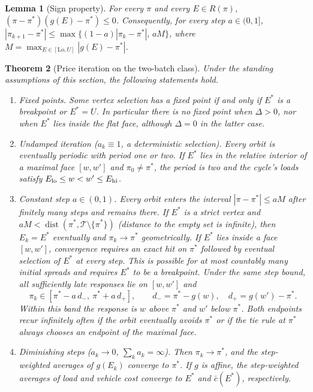 \documentclass[11pt]{article}
\newtheorem{theorem}{Theorem}
\newtheorem{lemma}[theorem]{Lemma}
\theoremstyle{definition}\newtheorem{definition}[theorem]{Definition}
\theoremstyle{remark}\newtheorem{remark}[theorem]{Remark}
\begin{document}
\begin{lemma}[Sign property]\label{lem:sign}
For every $\pi$ and every $E\in R(\pi)$, $(\pi-\pi^*)(g(E)-\pi^*)\le0$.
Consequently, for every step $a\in(0,1]$,
$|\pi_{k+1}-\pi^*|\le\max\{(1-a)|\pi_k-\pi^*|,\,aM\}$, where
$M=\max_{E\in[\mathrm{Lo},U]}|g(E)-\pi^*|$.
\end{lemma}

\begin{theorem}[Price iteration on the two-batch class]\label{thm:iteration}
Under the standing assumptions of this section, the following statements hold.
\begin{enumerate}[label=(\alph*),itemsep=2pt]
\item \emph{Fixed points.} Some vertex selection has a fixed point if and only if
$E^*$ is a breakpoint or $E^*=U$. In particular there is no fixed point when $\Delta>0$, nor when $E^*$ lies
inside the flat face, although $\Delta=0$ in the latter case.
\item \emph{Undamped iteration} ($a_k\equiv1$, a deterministic selection). Every orbit is eventually
periodic with period one or two. If $E^*$ lies in the relative interior of a
maximal face $[w,w']$ and $\pi_0\neq\pi^*$, the period is two and the cycle's loads satisfy
$E_{\rm lo}\le w<w'\le E_{\rm hi}$.
\item \emph{Constant step} $a\in(0,1)$. Every orbit enters the interval
$|\pi-\pi^*|\le aM$ after finitely many steps and remains there. If $E^*$ is a strict
vertex and $aM<\operatorname{dist}(\pi^*,\mathcal T\setminus\{\pi^*\})$
(distance to the empty set is infinite), then $E_k=E^*$ eventually and
$\pi_k\to\pi^*$ geometrically. If $E^*$ lies inside a face $[w,w']$,
convergence requires an exact hit on $\pi^*$ followed by eventual selection
of $E^*$ at every step. This is possible for at most countably many initial
spreads and requires $E^*$ to be a breakpoint. Under the same step bound,
all sufficiently late responses lie on $[w,w']$ and
\[
 \pi_k\in[\pi^*-a\,d_-,\ \pi^*+a\,d_+],\qquad
 d_-=\pi^*-g(w),\quad d_+=g(w')-\pi^* .
\]
Within this band the response is $w$ above $\pi^*$ and $w'$ below $\pi^*$.
Both endpoints recur infinitely often if the orbit eventually avoids $\pi^*$
or if the tie rule at $\pi^*$ always chooses an endpoint of the maximal face.
\item \emph{Diminishing steps} ($a_k\to0$, $\sum_ka_k=\infty$). Then $\pi_k\to\pi^*$,
and the step-weighted averages of $g(E_k)$ converge to $\pi^*$. If $g$ is affine,
the step-weighted averages of load and vehicle cost converge to $E^*$ and
$\bar c(E^*)$, respectively.
\end{enumerate}
\end{theorem}
\end{document}
